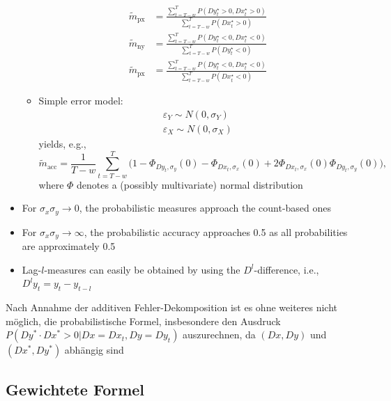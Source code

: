 \documentclass[oneside]{article}
\theoremstyle{plain}%
\theoremstyle{definition}
\newcommand{\ydiff}{D y}
\newcommand{\ydifft}{Dy^\star}
\newcommand{\xdiff}{Dx}
\newcommand{\xdifft}{Dx^\star}
\newcommand{\Prob}[1]{P(#1)}
\newcommand{\mprob}{\tilde{m}}
\begin{document}
\begin{itemize}
\begin{itemize}
\begin{align}
    \mprob_{\text{px}} &= \frac{\sum_{t=T-w}^T \Prob{\ydifft_t > 0, \xdifft_t > 0}}{\sum_{t=T-w}^T \Prob{\xdifft_t > 0}} \\
    \mprob_{\text{ny}} &= \frac{\sum_{t=T-w}^T \Prob{\ydifft_t < 0, \xdifft_t < 0}}{\sum_{t=T-w}^T \Prob{\ydifft_t < 0}} \\
    \mprob_{\text{px}} &= \frac{\sum_{t=T-w}^T \Prob{\ydifft_t < 0, \xdifft_t < 0}}{\sum_{t=T-w}^T \Prob{\xdifft_t < 0}} 
\end{align} 
\item Simple error model:
  \begin{align}
	  \varepsilon_Y \sim N(0, \sigma_Y) \\
	  \varepsilon_X \sim N(0, \sigma_X)
  \end{align}
  yields, e.g.,
  	\begin{equation}
  		\mprob_{\text{acc}} = \frac{1}{T-w} \sum_{t=T-w}^T  \big( 1 - \Phi_{\ydiff_t, \sigma_y}(0) - \Phi_{\xdiff_t, \sigma_x} (0) + 2 \Phi_{\xdiff_t,\sigma_x}( 0)\Phi_{\ydiff_t,\sigma_y}( 0) \big), 
	\end{equation}
	where $\Phi$ denotes a (possibly multivariate) normal distribution
\end{itemize}
\item For $\sigma_x \sigma_y \rightarrow 0$, the probabilistic measures approach the count-based ones
\item For $\sigma_x \sigma_y \rightarrow \infty$, the probabilistic accuracy approaches   0.5 as all probabilities are approximately 0.5
\item Lag-$l$-measures can easily be obtained by using the $D^l$-difference, i.e., $D^l y_t = y_t - y_{t-l}$
\end{itemize}


Nach Annahme der additiven Fehler-Dekomposition ist es ohne weiteres nicht möglich, die probabilistische Formel, insbesondere den Ausdruck $P(Dy^*\cdot Dx^* > 0|Dx=Dx_t, Dy=Dy_t) $ auszurechnen, da $(Dx,Dy)$ und $(Dx^*,Dy^*)$ abhängig sind

\subsection{Gewichtete Formel }
\end{document}
